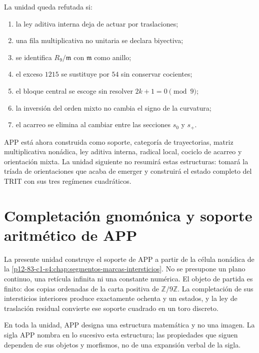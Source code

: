 \begin{criterion}
La unidad queda refutada si:
\begin{enumerate}
 \item la ley aditiva interna deja de actuar por traslaciones;
 \item una fila multiplicativa no unitaria se declara biyectiva;
 \item se identifica \(R_9/\mathfrak m\) con \(\mathfrak m\) como anillo;
 \item el exceso \(1215\) se sustituye por \(54\) sin conservar cocientes;
 \item el bloque central se escoge sin resolver \(2k+1=0\pmod9\);
 \item la inversión del orden mixto no cambia el signo de la curvatura;
 \item el acarreo se elimina al cambiar entre las secciones \(s_0\) y
       \(s_+\).
\end{enumerate}
\end{criterion}

APP está ahora construida como soporte, categoría de trayectorias, matriz
multiplicativa nonádica, ley aditiva interna, radical local, cociclo de
acarreo y orientación mixta. La unidad
siguiente no resumirá estas estructuras: tomará la tríada de orientaciones
que acaba de emerger y construirá el estado completo del TRIT con sus tres regímenes
cuadráticos.



\section{Completación gnomónica y soporte aritmético de APP}
\label{p12-83-c1-s2:chap:app-completacion-gnomonica}

La presente unidad construye el soporte de APP a partir de la célula
nonádica de la \cref{p12-83-c1-s4:chap:segmentos-marcas-intersticios}. No se presupone un
plano continuo, una retícula infinita ni una constante numérica. El objeto de
partida es finito: dos copias ordenadas de la carta positiva de
\(\mathbb Z/9\mathbb Z\). La completación de sus intersticios interiores
produce exactamente ochenta y un estados, y la ley de traslación residual
convierte ese soporte cuadrado en un toro discreto.

En toda la unidad, APP designa una estructura matemática y no una imagen.
La sigla APP nombra en lo sucesivo esta estructura; las propiedades que
siguen dependen de sus objetos y morfismos, no de una expansión verbal de la
sigla.

